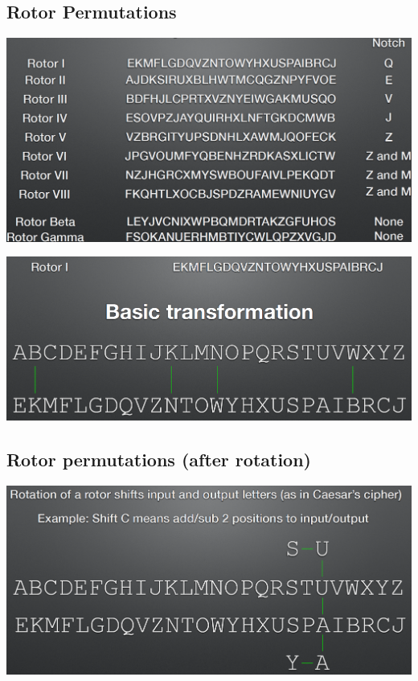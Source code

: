        	\subsection{Rotor Permutations}
       		\begin{center}
         		\includegraphics[width=180mm]{Graphics/Historical Ciphers/Enigma3.png}\newline
       		\end{center}
       		\begin{center}
         		\includegraphics[width=180mm]{Graphics/Historical Ciphers/Enigma4.png}\newline
       		\end{center}
       	
       	\subsection{Rotor permutations (after rotation)}
       		\begin{center}
         		\includegraphics[width=180mm]{Graphics/Historical Ciphers/Enigma5.png}\newline
       		\end{center}
       	
